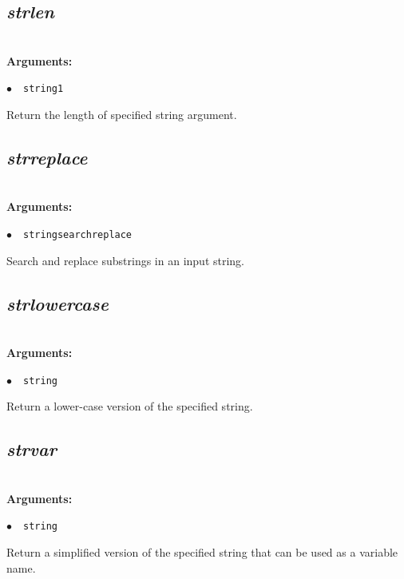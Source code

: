 \documentclass[a4paper,10.5pt,twoside]{book}
\def\comma{\discretionary{,}{}{,}}
\newcommand{\Cb}[1]{\textcolor{cb}{#1}}
\begin{document}
\subsection{\emph{strlen} }\vspace*{-0.7em}
~\\\textbf{\Cb{Arguments: }}\begin{flushleft}
{\small \Cb{\hspace*{0.5cm}$\bullet$~~\texttt{string1}}}\end{flushleft}
Return the length of specified string argument.


\subsection{\emph{strreplace} }\vspace*{-0.7em}
~\\\textbf{\Cb{Arguments: }}\begin{flushleft}
{\small \Cb{\hspace*{0.5cm}$\bullet$~~\texttt{string{\comma}search{\comma}replace}}}\end{flushleft}
Search and replace substrings in an input string.


\subsection{\emph{strlowercase} }\vspace*{-0.7em}
~\\\textbf{\Cb{Arguments: }}\begin{flushleft}
{\small \Cb{\hspace*{0.5cm}$\bullet$~~\texttt{string}}}\end{flushleft}
Return a lower-case version of the specified string.


\subsection{\emph{strvar} }\vspace*{-0.7em}
~\\\textbf{\Cb{Arguments: }}\begin{flushleft}
{\small \Cb{\hspace*{0.5cm}$\bullet$~~\texttt{string}}}\end{flushleft}
Return a simplified version of the specified string{\comma} that can be used as a variable name.
\end{document}
